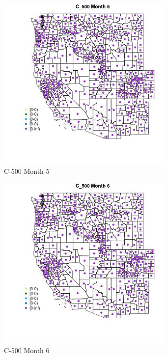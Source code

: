 \begin{figure} 
\centering  
\includegraphics[width=0.77\textwidth]{Code_Outputs/df_report_ML_predictors_CountyCentroid_Locations_Dates_2008-01-01to2018-12-31_MapObsMo5C_500.jpg} 
\caption{\label{fig:df_report_ML_predictors_CountyCentroid_Locations_Dates_2008-01-01to2018-12-31MapObsMo5C_500}C-500 Month 5} 
\end{figure} 
 

\begin{figure} 
\centering  
\includegraphics[width=0.77\textwidth]{Code_Outputs/df_report_ML_predictors_CountyCentroid_Locations_Dates_2008-01-01to2018-12-31_MapObsMo6C_500.jpg} 
\caption{\label{fig:df_report_ML_predictors_CountyCentroid_Locations_Dates_2008-01-01to2018-12-31MapObsMo6C_500}C-500 Month 6} 
\end{figure} 
 

